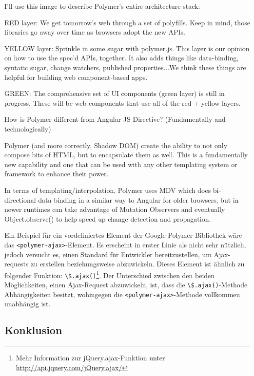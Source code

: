 I'll use this image to describe Polymer's entire architecture stack:

RED layer: We get tomorrow's web through a set of polyfills. Keep in mind, those libraries go away over time as browsers adopt the new APIs.

YELLOW layer: Sprinkle in some sugar with polymer.js. This layer is our opinion on how to use the spec'd APIs, together. It also adds things like data-binding, syntatic sugar, change watchers, published properties...We think these things are helpful for building web component-based apps.

GREEN: The comprehensive set of UI components (green layer) is still in progress. These will be web components that use all of the red + yellow layers.


How is Polymer different from Angular JS Directive? (Fundamentally and technologically)

Polymer (and more correctly, Shadow DOM) create the ability to not only compose bits of HTML, but to encapsulate them as well. This is a fundamentally new capability and one that can be used with any other templating system or framework to enhance their power.

In terms of templating/interpolation, Polymer uses MDV which does bi-directional data binding in a similar way to Angular for older browsers, but in newer runtimes can take advantage of Mutation Observers and eventually Object.observe() to help speed up change detection and propagation.
\fi



Ein Beispiel für ein vordefiniertes Element der Google-Polymer Bibliothek wäre das \lstinline|<polymer-ajax>|-Element. Es erscheint in erster Linie als nicht sehr nützlich, jedoch versucht es, einen Standard für Entwickler bereitzustellen, um Ajax-requests zu erstellen beziehungsweise abzuwickeln. Dieses Element ist ähnlich zu folgender Funktion: \lstinline|\$.ajax()|\footnote{Mehr Information zur jQuery.ajax-Funktion unter \href{http://api.jquery.com/jQuery.ajax/}{http://api.jquery.com/jQuery.ajax/}}. Der Unterschied zwischen den beiden Möglichkeiten, einen Ajax-Request abzuwickeln, ist, dass die \lstinline|\$.ajax()|-Methode Abhängigkeiten besitzt, wohingegen die \lstinline|<polymer-ajax>|-Methode vollkommen unabhängig ist.

\subsection{Konklusion}
\label{sec:3_Konklusion}



